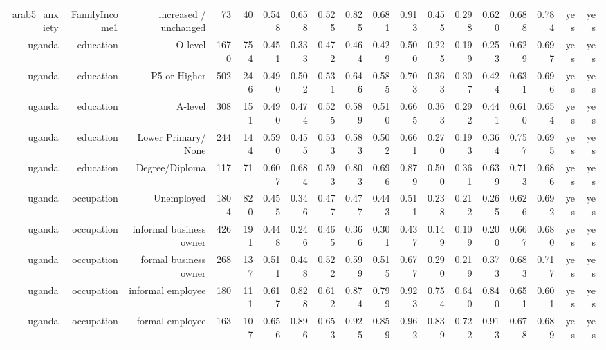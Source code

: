 \documentclass[10pt]{article}
\begin{document}
\begin{longtable}{rrrrrrrrrrrrrrrrrr}
arab5\_anxiety & FamilyIncome1 & increased / unchanged & 73 & 40 & 0.548 & 0.658 & 0.525 & 0.825 & 0.681 & 0.913 & 0.455 & 0.298 & 0.620 & 0.688 & 0.784 & yes & yes \\
uganda & education & O-level & 1670 & 754 & 0.451 & 0.333 & 0.472 & 0.464 & 0.429 & 0.500 & 0.225 & 0.199 & 0.253 & 0.629 & 0.697 & yes & yes \\
uganda & education & P5 or Higher & 502 & 246 & 0.490 & 0.502 & 0.531 & 0.646 & 0.585 & 0.703 & 0.363 & 0.307 & 0.424 & 0.631 & 0.696 & yes & yes \\
uganda & education & A-level & 308 & 151 & 0.490 & 0.474 & 0.525 & 0.589 & 0.510 & 0.665 & 0.363 & 0.292 & 0.441 & 0.610 & 0.654 & yes & yes \\
uganda & education & Lower Primary/ None & 244 & 144 & 0.590 & 0.455 & 0.533 & 0.583 & 0.502 & 0.661 & 0.270 & 0.193 & 0.364 & 0.757 & 0.695 & yes & yes \\
uganda & education & Degree/Diploma & 117 & 71 & 0.607 & 0.684 & 0.593 & 0.803 & 0.696 & 0.879 & 0.500 & 0.361 & 0.639 & 0.713 & 0.686 & yes & yes \\
uganda & occupation & Unemployed & 1804 & 820 & 0.455 & 0.346 & 0.477 & 0.477 & 0.443 & 0.511 & 0.238 & 0.212 & 0.265 & 0.626 & 0.692 & yes & yes \\
uganda & occupation & informal business owner & 426 & 191 & 0.448 & 0.246 & 0.465 & 0.366 & 0.301 & 0.437 & 0.149 & 0.109 & 0.200 & 0.667 & 0.680 & yes & yes \\
uganda & occupation & formal business owner & 268 & 137 & 0.511 & 0.448 & 0.522 & 0.599 & 0.515 & 0.677 & 0.290 & 0.219 & 0.373 & 0.683 & 0.717 & yes & yes \\
uganda & occupation & informal employee & 180 & 111 & 0.617 & 0.828 & 0.612 & 0.874 & 0.799 & 0.923 & 0.754 & 0.640 & 0.840 & 0.651 & 0.601 & yes & yes \\
uganda & occupation & formal employee & 163 & 107 & 0.656 & 0.896 & 0.653 & 0.925 & 0.859 & 0.962 & 0.839 & 0.722 & 0.913 & 0.678 & 0.689 & yes & yes \\
\bottomrule
\end{longtable}
\normalsize
\end{document}
